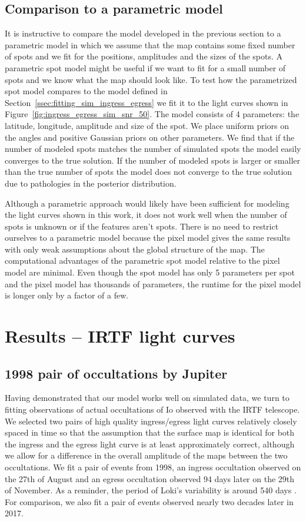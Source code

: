 \documentclass[modern]{aastex62}
\begin{document}
\subsection{Comparison to a parametric model}
It is instructive to compare the model developed in the previous section to a parametric model in which we assume that the map contains some fixed number of spots and we fit for the positions, amplitudes and the sizes of the spots.
A parametric spot model might be useful if we want to fit for a small number of spots and we know what the map should look like.
To test how the parametrized spot model compares to the model defined in Section~\ref{ssec:fitting_sim_ingress_egress} we fit it to the light curves shown in Figure~\ref{fig:ingress_egress_sim_snr_50}. 
The model consists of 4 parameters: the latitude, longitude, amplitude and size of the spot.
We place uniform priors on the angles and positive Gaussian priors on other parameters. 
We find that if the number of modeled spots matches the number of simulated spots the model easily converges to the true solution. 
If the number of modeled spots is larger or smaller than the true number of spots the model does not converge to the true solution due to pathologies in the posterior distribution.

Although a parametric approach would likely have been sufficient for modeling the light curves shown in this work, it does not work well when the number of spots is unknown or if the features aren't spots.
There is no need to restrict ourselves to a parametric model because the pixel model gives the same results with only weak assumptions about the global structure of the map. 
The computational advantages of the parametric spot model relative to the pixel model are minimal. 
Even though the spot model has only 5 parameters per spot and the pixel model has thousands of parameters, the runtime for the pixel model is longer only by a factor of a few. 

\section{Results -- IRTF light curves}
\label{sec:results}
\subsection{1998 pair of occultations by Jupiter}
Having demonstrated that our model works well on simulated data, we turn to fitting observations of actual occultations of Io observed with the IRTF telescope.
We selected two pairs of high quality ingress/egress light curves relatively closely spaced in time so that the assumption that the surface map is identical for both the ingress and the egress light curve is at least approximately correct, although we allow for a difference in the overall amplitude of the maps between the two occultations.
We fit a pair of events from 1998, an ingress occultation observed on the 27th of August and an egress occultation observed  94 days later on the 29th of November.
As a reminder, the period of Loki's variability is around 540 days \citep{rathbun2002}.
For comparison, we also fit a pair of events observed nearly two decades later in 2017.
\end{document}
